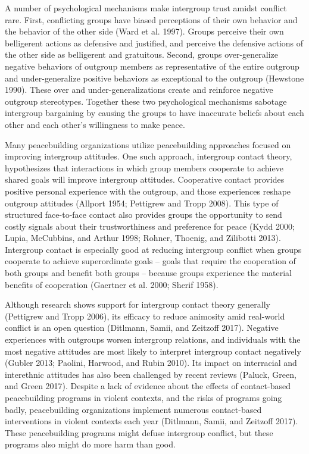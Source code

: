 \documentclass[11pt]{article}
\begin{document}
A number of psychological mechanisms make intergroup trust amidst
conflict rare. First, conflicting groups have biased perceptions of
their own behavior and the behavior of the other side (Ward et al.
1997). Groups perceive their own belligerent actions as defensive and
justified, and perceive the defensive actions of the other side as
belligerent and gratuitous. Second, groups over-generalize negative
behaviors of outgroup members as representative of the entire outgroup
and under-generalize positive behaviors as exceptional to the outgroup
(Hewstone 1990). These over and under-generalizations create and
reinforce negative outgroup stereotypes. Together these two
psychological mechanisms sabotage intergroup bargaining by causing the
groups to have inaccurate beliefs about each other and each other's
willingness to make peace.

Many peacebuilding organizations utilize peacebuilding approaches
focused on improving intergroup attitudes. One such approach, intergroup
contact theory, hypothesizes that interactions in which group members
cooperate to achieve shared goals will improve intergroup attitudes.
Cooperative contact provides positive personal experience with the
outgroup, and those experiences reshape outgroup attitudes (Allport
1954; Pettigrew and Tropp 2008). This type of structured face-to-face
contact also provides groups the opportunity to send costly signals
about their trustworthiness and preference for peace (Kydd 2000; Lupia,
McCubbins, and Arthur 1998; Rohner, Thoenig, and Zilibotti 2013).
Intergroup contact is especially good at reducing intergroup conflict
when groups cooperate to achieve superordinate goals -- goals that
require the cooperation of both groups and benefit both groups --
because groups experience the material benefits of cooperation (Gaertner
et al. 2000; Sherif 1958).

Although research shows support for intergroup contact theory generally
(Pettigrew and Tropp 2006), its efficacy to reduce animosity amid
real-world conflict is an open question (Ditlmann, Samii, and Zeitzoff
2017). Negative experiences with outgroups worsen intergroup relations,
and individuals with the most negative attitudes are most likely to
interpret intergroup contact negatively (Gubler 2013; Paolini, Harwood,
and Rubin 2010). Its impact on interracial and interethnic attitudes has
also been challenged by recent reviews (Paluck, Green, and Green 2017).
Despite a lack of evidence about the effects of contact-based
peacebuilding programs in violent contexts, and the risks of programs
going badly, peacebuilding organizations implement numerous
contact-based interventions in violent contexts each year (Ditlmann,
Samii, and Zeitzoff 2017). These peacebuilding programs might defuse
intergroup conflict, but these programs also might do more harm than
good.
\end{document}

